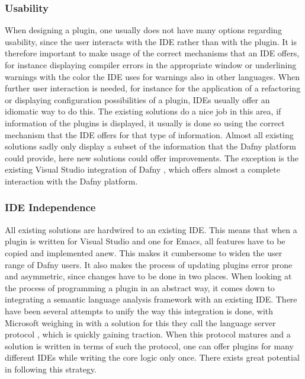 \subsubsection{Usability}
When designing a plugin, one usually does not have many options regarding usability, since the user interacts with the IDE rather than with the plugin. It is therefore important to make usage of the correct mechanisms that an IDE offers, for instance displaying compiler errors in the appropriate window or underlining warnings with the color the IDE uses for warnings also in other languages. When further user interaction is needed, for instance for the application of a refactoring or displaying configuration possibilities of a plugin, IDEs usually offer an idiomatic way to do this.  \newline
The existing solutions do a nice job in this area, if information of the plugins is displayed, it usually is done so using the correct mechanism that the IDE offers for that type of information. Almost all existing solutions sadly only display a subset of the information that the Dafny platform could provide, here new solutions could offer improvements. The exception is the existing Visual Studio integration of Dafny \cite{visualstudiodafny}, which offers almost a complete interaction with the Dafny platform. 
\subsubsection{IDE Independence}
All existing solutions are hardwired to an existing IDE. This means that when a plugin is written for Visual Studio and one for Emacs, all features have to be copied and implemented anew. This makes it cumbersome to widen the user range of Dafny users. It also makes the process of updating plugins error prone and asymmetric, since changes have to be done in two places. \newline
When looking at the process of programming a plugin in an abstract way, it comes down to integrating a semantic language analysis framework with an existing IDE. There have been several attempts to unify the way this integration is done, with Microsoft weighing in with a solution for this they call the language server protocol \cite{langserver}, which is quickly gaining traction. When this protocol matures and a solution is written in terms of such the protocol, one can offer plugins for many different IDEs while writing the core logic only once. There exists great potential in following this strategy. 
